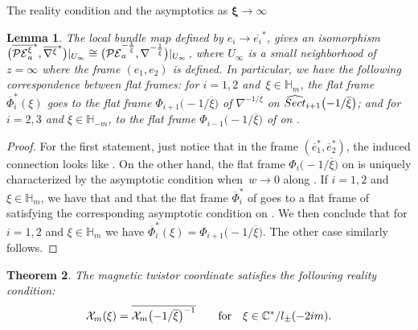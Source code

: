 \documentclass[11pt]{article}
\numberwithin{equation}{section}
\newtheorem{Theorem}{Theorem}[section]
\newtheorem{Lemma}[Theorem]{Lemma}
\numberwithin{equation}{section}
\begin{document}
\begin{subsubsection}{The reality condition and the asymptotics as $\boldsymbol{\xi \to \infty}$}
\begin{Lemma}
The local bundle map defined by $e_i\to \overline{e_i}^{*}$, gives an isomorphism $\smash{\bigl(\overline{\mathcal{PE}_a^{\xi}}^*,\overline{\nabla^{\xi}}^*\bigr)}|_{U_\infty}\allowbreak\cong \smash{\bigl(\mathcal{PE}_a^{-\frac{1}{\overline{\xi}}},\nabla^{-\frac{1}{\overline{\xi}}}\bigr)}|_{U_\infty}$, where $U_\infty$ is a small neighborhood of $z=\infty$ where the frame $(e_1,e_2)$ is defined. In particular, we have the following correspondence between flat frames: for $i=1,2$ and~${\xi \in \mathbb{H}_m}$, the flat frame $\overline{\Phi}_i^{*}(\xi)$ goes to the flat frame $\Phi_{i+1}\bigl(-1/\overline{\xi}\bigr)$ of $\nabla^{-1/\overline{\xi}}$ on $\widehat{\textnormal{Sect}}_{i+1}\bigl(-1/\overline{\xi}\bigr)$; and for~${i=2,3}$ and $\xi \in \mathbb{H}_{-m}$, to the flat frame $\Phi_{i-1}\bigl(-1/\overline{\xi}\bigr)$ of  on .
\end{Lemma}

\begin{proof}

For the first statement, just notice that in the frame $(\overline{e}_1^{*},\overline{e}_2^*)$, the induced connection looks like . On the other hand, the flat frame $\Phi_{i}\bigl(-1/\overline{\xi}\bigr)$ on  is uniquely characterized by the asymptotic condition  when~${w\to 0}$ along . If $i=1,2$ and $\xi \in \mathbb{H}_m$, we have that  and that the flat frame $\overline{\Phi}_i^{*}$ of \smash{$\overline{\nabla^{\xi}}^*$} goes to a flat frame of  satisfying the corresponding asymptotic condition on . We then conclude that for $i=1,2$ and $\xi \in \mathbb{H}_m$ we have $\overline{\Phi}^*_i(\xi)=\Phi_{i+1}\bigl(-1/\overline{\xi}\bigr)$. The other case similarly follows.
\end{proof}

\begin{Theorem}\label{rct}
The magnetic twistor coordinate satisfies the following reality condition:
\begin{equation*}
 \mathcal{X}_m(\xi)=\overline{\mathcal{X}_m\bigl(-1/\overline{\xi}\bigr)^{-1}} \qquad \text{for} \quad \xi \in \mathbb{C
 }^*/l_{\pm}(-2{\rm i}m).
\end{equation*}
\end{Theorem}


\end{subsubsection}
\end{document}
